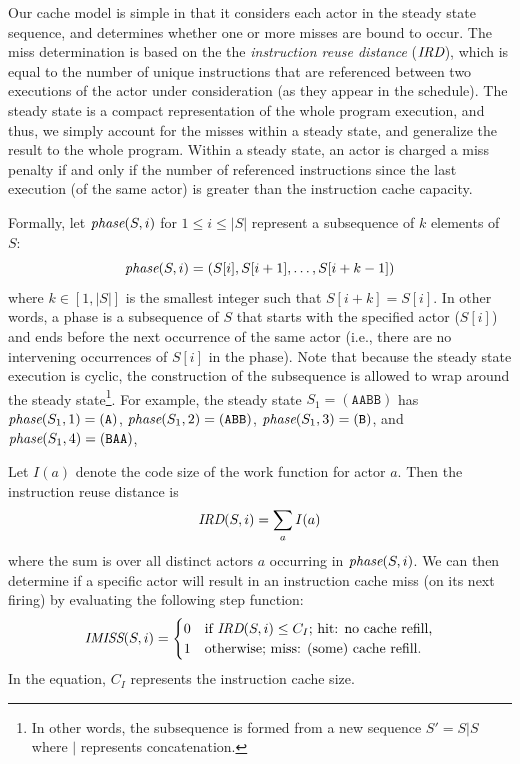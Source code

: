\documentclass{sigplanconf}
\newcommand{\mt}[1]{\mbox{\it #1}}
\begin{document}
Our cache model is simple in that it considers each actor in the
steady state sequence, and determines whether one or more misses are
bound to occur. The miss determination is based on the 
the {\it instruction reuse distance} ($\mt{IRD}$), which is equal to
the number of unique instructions that are referenced between two
executions of the actor under consideration (as they appear in the
schedule). The steady state is a 
compact representation of the whole program execution, and thus, we
simply account for the misses within a steady state, and generalize
the result to the whole program. Within a steady state, an actor is
charged a miss penalty if and only if the number of referenced
instructions since the last execution (of the same actor)
is greater than the instruction cache capacity.

Formally, let $\mt{phase}(S,i)$ for $1\le i\le|S|$ represent a
subsequence of $k$ elements of $S$:
\[ 
\mt{phase}(S,i) = ( S[i], S[i+1], \ldots, S[i+k-1] )
\]
where $k\in[1,|S|]$ is the smallest integer such that $S[i+k]=S[i]$.
In other words, a phase is a subsequence of $S$ that starts with the
specified actor ($S[i]$) and ends before the next occurrence of the same actor
(i.e., there are no intervening occurrences of $S[i]$ in the phase).
Note that because the steady state
execution is cyclic, the construction of the subsequence is allowed to
wrap around the steady state\footnote{In other words, the subsequence
is formed from a new sequence $S'=S|S$ where $|$ represents
concatenation.}. For example, the steady state $S_1=(\texttt{AABB})$
has 
$\mt{phase}(S_1,1)=(\texttt{A})$,
$\mt{phase}(S_1,2)=(\texttt{ABB})$,
$\mt{phase}(S_1,3)=(\texttt{B})$, and
$\mt{phase}(S_1,4)=(\texttt{BAA})$,


Let $I(a)$ denote the code size of the work function for actor $a$.
Then the instruction reuse distance is
\[
\mt{IRD}(S,i)=\sum_{a} I(a)
\]
where the sum is over all distinct actors $a$ occurring in
$\mt{phase}(S,i)$. We can then determine if a specific actor will
result in an instruction cache miss (on its next firing) by evaluating
the following step function:
\begin{equation}
\label{eq:imiss}
  \mt{IMISS}(S,i) =
    \begin{cases}
      0& \text{if $\mt{IRD}(S,i) \leq C_I$; hit: no cache refill,}\\
      1& \text{otherwise; miss: (some) cache refill.}
    \end{cases}
\end{equation}
In the equation, $C_I$ represents the instruction cache size. 
\end{document}
